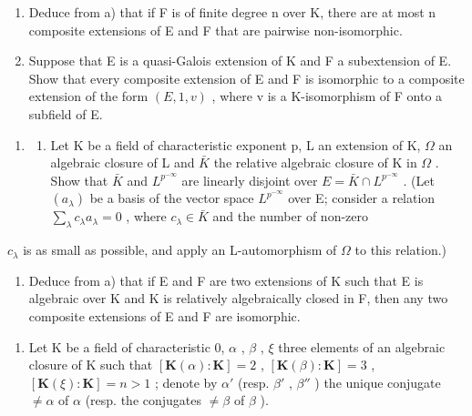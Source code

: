 \begin{enumerate}
\def\labelenumi{\alph{enumi})}
\setcounter{enumi}{1}
\item
  Deduce from a) that if F is of finite degree n over K, there are at most n composite extensions of E and F that are pairwise non-isomorphic.
\item
  Suppose that E is a quasi-Galois extension of K and F a subextension of E. Show that every composite extension of E and F is isomorphic to a composite extension of the form \((E, 1, v)\) , where v is a K-isomorphism of F onto a subfield of E.
\end{enumerate}

\begin{enumerate}
\def\labelenumi{\arabic{enumi})}
\setcounter{enumi}{5}
\tightlist
\item
  \begin{enumerate}
  \def\labelenumii{\alph{enumii})}
  \tightlist
  \item
    Let K be a field of characteristic exponent p, L an extension of K, \(\Omega\) an algebraic closure of L and \(\bar{K}\) the relative algebraic closure of K in \(\Omega\) . Show that \(\bar{K}\) and \(L^{p^{-\infty}}\) are linearly disjoint over \(E = \bar{K} \cap L^{p^{-\infty}}\) . (Let \((a_{\lambda})\) be a basis of the vector space \(L^{p^{-\infty}}\) over E; consider a relation \(\sum_{\lambda} c_{\lambda} a_{\lambda} = 0\) , where \(c_{\lambda} \in \bar{K}\) and the number of non-zero
  \end{enumerate}
\end{enumerate}

\(c_{\lambda}\) is as small as possible, and apply an L-automorphism of \(\Omega\) to this relation.)

\begin{enumerate}
\def\labelenumi{\alph{enumi})}
\setcounter{enumi}{1}
\tightlist
\item
  Deduce from a) that if E and F are two extensions of K such that E is algebraic over K and K is relatively algebraically closed in F, then any two composite extensions of E and F are isomorphic.
\end{enumerate}

\begin{enumerate}
\def\labelenumi{\arabic{enumi})}
\setcounter{enumi}{6}
\tightlist
\item
  Let K be a field of characteristic 0, \(\alpha\) , \(\beta\) , \(\xi\) three elements of an algebraic closure of K such that \([\mathbf{K}(\alpha):\mathbf{K}] = 2\) , \([\mathbf{K}(\beta):\mathbf{K}] = 3\) , \([\mathbf{K}(\xi):\mathbf{K}] = n > 1\) ; denote by \(\alpha'\) (resp. \(\beta'\) , \(\beta''\) ) the unique conjugate \(\neq \alpha\) of \(\alpha\) (resp. the conjugates \(\neq \beta\) of \(\beta\) ).
\end{enumerate}

